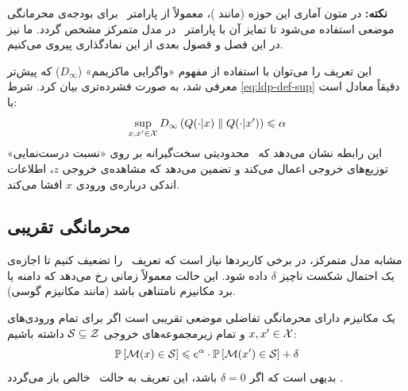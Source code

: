\textbf{نکته:} در متون آماری این حوزه (مانند \cite{Duchi2013})، معمولاً از پارامتر \al \ برای بودجه‌ی محرمانگی موضعی استفاده می‌شود تا تمایز آن با پارامتر \eps \ در مدل متمرکز مشخص گردد. ما نیز در این فصل و فصول بعدی از این نمادگذاری پیروی می‌کنیم.

این تعریف را می‌توان با استفاده از مفهوم «واگرایی ماکزیمم» ($D_\infty$) که پیش‌تر معرفی شد، به صورت فشرده‌تری بیان کرد. شرط \eqref{eq:ldp-def-sup} دقیقاً معادل است با:
\begin{equation}
\label{eq:ldp-dinf}
\sup_{x, x' \in \Xset} D_\infty\left(Q(\cdot|x) \parallel Q(\cdot|x')\right) \le \al
\end{equation}
این رابطه نشان می‌دهد که \LDP \ محدودیتی سخت‌گیرانه بر روی «نسبت درست‌نمایی» توزیع‌های خروجی اعمال می‌کند و تضمین می‌دهد که مشاهده‌ی خروجی $z$، اطلاعات اندکی درباره‌ی ورودی $x$ افشا می‌کند.

\subsection{محرمانگی تقریبی}

مشابه مدل متمرکز، در برخی کاربردها نیاز است که تعریف \LDP \ را تضعیف کنیم تا اجازه‌ی یک احتمال شکست ناچیز $\delta$ داده شود. این حالت معمولاً زمانی رخ می‌دهد که دامنه یا برد مکانیزم نامتناهی باشد (مانند مکانیزم گوسی).

\begin{تعریف}
\label{def:approx-ldp}
یک مکانیزم \mech دارای محرمانگی تفاضلی موضعی تقریبی است اگر برای تمام ورودی‌های $x, x' \in \Xset$ و تمام زیرمجموعه‌های خروجی $\Sset \subseteq \Zset$ داشته باشیم:
\begin{equation}
\mathbb{P}\left[\mech(x) \in \Sset\right] \le e^{\al} \cdot \mathbb{P}\left[\mech(x') \in \Sset\right] + \delta
\end{equation}
بدیهی است که اگر $\delta=0$ باشد، این تعریف به حالت \LDP \ خالص باز می‌گردد \cite{Wang2020}.
\end{تعریف}

